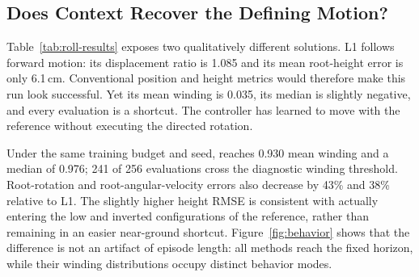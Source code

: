 \begin{table}[!t]
\centering
\caption{Roll evaluation and final training diagnostics.  L1 and \ours{} use
the same seed, 131.072M samples, and 256 ten-second evaluations.  The
instantaneous checkpoint is a shorter-budget qualitative reference.  Lower is
better for errors and shortcut rate; higher is better otherwise.}
\label{tab:roll-results}
\end{table}

\subsection{Does Context Recover the Defining Motion?}

Table~\ref{tab:roll-results} exposes two qualitatively different solutions.
L1 follows forward motion: its displacement ratio is 1.085 and its mean
root-height error is only 6.1\,cm.  Conventional position and height metrics
would therefore make this run look successful.  Yet its mean winding is
0.035, its median is slightly negative, and every evaluation is a shortcut.
The controller has learned to move with the reference without executing the
directed rotation.

Under the same training budget and seed, \ours{} reaches 0.930 mean winding
and a median of 0.976; 241 of 256 evaluations cross the diagnostic winding
threshold.  Root-rotation and root-angular-velocity errors also decrease by
43\% and 38\% relative to L1.  The slightly higher height RMSE is consistent
with actually entering the low and inverted configurations of the reference,
rather than remaining in an easier near-ground shortcut.  Figure~\ref{fig:behavior}
shows that the difference is not an artifact of episode length: all methods
reach the fixed horizon, while their winding distributions occupy distinct
behavior modes.

